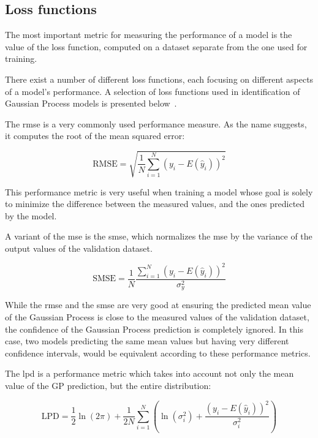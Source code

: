 \subsection{Loss functions}

The most important metric for measuring the performance of a model is the value
of the loss function, computed on a dataset separate from the one used for
training.

There exist a number of different loss functions, each focusing on different
aspects of a model's performance. A selection of loss functions used in
identification of Gaussian Process models is presented
below~\cite{kocijanModellingControlDynamic2016}.

The \acrfull{rmse} is a very commonly used performance measure. As the name
suggests, it computes the root of the mean squared error:

\begin{equation}\label{eq:rmse}
    \text{RMSE} = \sqrt{\frac{1}{N}\sum_{i=1}^N \left(y_i -
    E(\hat{y}_i)\right)^{2}}
\end{equation}

This performance metric is very useful when training a model whose goal is
solely to minimize the difference between the measured values, and the ones
predicted by the model.

A variant of the \acrfull{mse} is the \acrfull{smse}, which normalizes the
\acrshort{mse} by the variance of the output values of the validation dataset.

\begin{equation}\label{eq:smse}
    \text{SMSE} = \frac{1}{N}\frac{\sum_{i=1}^N \left(y_i -
    E(\hat{y}_i)\right)^{2}}{\sigma_y^2}
\end{equation}

While the \acrshort{rmse} and the \acrshort{smse} are very good at ensuring the
predicted mean value of the Gaussian Process is close to the measured values of
the validation dataset, the confidence of the Gaussian Process prediction is
completely ignored. In this case, two models predicting the same mean values but
having very different confidence intervals, would be equivalent according to these
performance metrics.

The \acrfull{lpd} is a performance metric which takes into account not only the
mean value of the GP prediction, but the entire distribution:

\begin{equation}
    \text{LPD} = \frac{1}{2} \ln{\left(2\pi\right)} + \frac{1}{2N}
    \sum_{i=1}^N\left(\ln{\left(\sigma_i^2\right)} + \frac{\left(y_i -
    E(\hat{y}_i)\right)^{2}}{\sigma_i^2}\right)
\end{equation}

